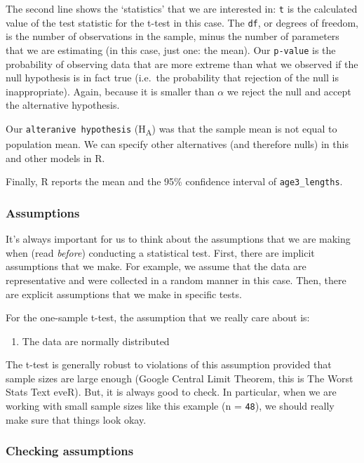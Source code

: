 \documentclass[
]{book}
\providecommand{\tightlist}{%
  \setlength{\itemsep}{0pt}\setlength{\parskip}{0pt}}
\begin{document}
The second line shows the `statistics' that we are interested in: \texttt{t} is the calculated value of the test statistic for the t-test in this case. The \texttt{df}, or degrees of freedom, is the number of observations in the sample, minus the number of parameters that we are estimating (in this case, just one: the mean). Our \texttt{p-value} is the probability of observing data that are more extreme than what we observed if the null hypothesis is in fact true (i.e.~the probability that rejection of the null is inappropriate). Again, because it is smaller than \(\alpha\) we reject the null and accept the alternative hypothesis.

Our \texttt{alteranive\ hypothesis} (H\textsubscript{A}) was that the sample mean is not equal to population mean. We can specify other alternatives (and therefore nulls) in this and other models in R.

Finally, R reports the mean and the 95\% confidence interval of \texttt{age3\_lengths}.

\hypertarget{assumptions}{%
\subsubsection{Assumptions}\label{assumptions}}

It's always important for us to think about the assumptions that we are making when (read \emph{before}) conducting a statistical test. First, there are implicit assumptions that we make. For example, we assume that the data are representative and were collected in a random manner in this case. Then, there are explicit assumptions that we make in specific tests.

For the one-sample t-test, the assumption that we really care about is:

\begin{enumerate}
\def\labelenumi{\arabic{enumi}.}
\tightlist
\item
  The data are normally distributed
\end{enumerate}

The t-test is generally robust to violations of this assumption provided that sample sizes are large enough (Google Central Limit Theorem, this is The Worst Stats Text eveR). But, it is always good to check. In particular, when we are working with small sample sizes like this example (n = \texttt{48}), we should really make sure that things look okay.

\hypertarget{checking-assumptions}{%
\subsubsection{Checking assumptions}\label{checking-assumptions}}
\end{document}

